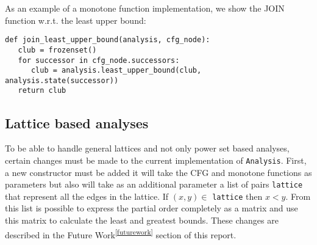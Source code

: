 As an example of a monotone function implementation, we show the JOIN function w.r.t. the least upper bound: 
\begin{verbatim}
def join_least_upper_bound(analysis, cfg_node):
   club = frozenset()
   for successor in cfg_node.successors:
      club = analysis.least_upper_bound(club, analysis.state(successor))
   return club
\end{verbatim}

\subsection{Lattice based analyses}
To be able to handle general lattices and not only power set based analyses, certain changes must be made to the current implementation of \texttt{Analysis}. First, a new constructor must be added it will take the CFG and monotone functions as parameters but also will take as an additional parameter a list of pairs \texttt{lattice} that represent all the edges in the lattice. If $(x,y) \in$ \texttt{lattice} then $x < y$. From this list is possible to express the partial order completely as a matrix and use this matrix to calculate the least and greatest bounds. These changes are described in the Future Work\textsuperscript{\ref{futurework}} section of this report. 


